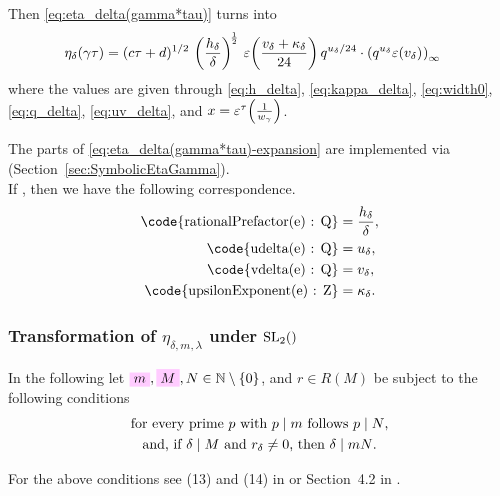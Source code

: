 \documentclass{article}
\begin{document}
Then \eqref{eq:eta_delta(gamma*tau)} turns into
\begin{align}
\eta_\delta(\gamma\tau)
&=
(c \tau+d)^{1/2}
\,
\left(\frac{h_\delta}{\delta}\right)^{\!\frac{1}{2}}
\,
  \unityPower{\frac{v_\delta + \kappa_\delta}{24}}
  q^{u_\delta/24} \cdot \eulerFunction[q^{u_\delta} \unityPower{v_\delta}]{}
\label{eq:eta_delta(gamma*tau)-expansion}
\end{align}
where the values are given through \eqref{eq:h_delta},
\eqref{eq:kappa_delta}, \eqref{eq:width0}, \eqref{eq:q_delta},
\eqref{eq:uv_delta}, and $x=\varepsilon^\tau\!\left(\frac{1}{w_\gamma}\right)$.



The parts of \eqref{eq:eta_delta(gamma*tau)-expansion} are implemented
via \textcolor{blue}{}
(Section~\ref{sec:SymbolicEtaGamma}).
\\
If , then we have the following
correspondence.
\begin{align*}
\text{\code{rationalPrefactor(e) : Q}} &= \frac{h_\delta}{\delta},\\
\text{\code{udelta(e) : Q}}            &= u_\delta,\\
\text{\code{vdelta(e) : Q}}            &= v_\delta,\\
\text{\code{upsilonExponent(e) : Z}}   &= \kappa_\delta.
\end{align*}






\subsubsection{Transformation of $\eta_{\delta,m,\lambda}$ under
  $\SL2Z$}
  \label{sec:transformation-eta_delta-m-lambda}

In the following let
$\defineNotation[m]{m},
\defineNotation[M]{M},
N \in \setN \setminus \Set{0}$, and
$r \in R(M)$
be subject to the following conditions
\begin{gather}
  \text{for every prime $p$ with $p \mid m$ follows $p \mid N$,}
  \\
  \text{and, if $\delta \mid M$ and $r_\delta\ne0$, then
    $\delta \mid mN$.}
\end{gather}

For the above conditions see (13) and (14) in
\cite{Radu_AlgorithmicApproachRamanujanCongruences_2009} or
Section~4.2 in \cite{Radu_PhD_2010}.
\end{document}
